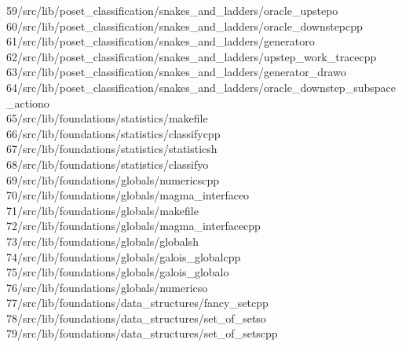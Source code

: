 \begin{tabbing}
59\>/src/lib/poset\_classification/snakes\_and\_ladders/oracle\_upstepo\\[0pt]
60\>/src/lib/poset\_classification/snakes\_and\_ladders/oracle\_downstepcpp\\[0pt]
61\>/src/lib/poset\_classification/snakes\_and\_ladders/generatoro\\[0pt]
62\>/src/lib/poset\_classification/snakes\_and\_ladders/upstep\_work\_tracecpp\\[0pt]
63\>/src/lib/poset\_classification/snakes\_and\_ladders/generator\_drawo\\[0pt]
64\>/src/lib/poset\_classification/snakes\_and\_ladders/oracle\_downstep\_subspace\_actiono\\[0pt]
65\>/src/lib/foundations/statistics/makefile\\[0pt]
66\>/src/lib/foundations/statistics/classifycpp\\[0pt]
67\>/src/lib/foundations/statistics/statisticsh\\[0pt]
68\>/src/lib/foundations/statistics/classifyo\\[0pt]
69\>/src/lib/foundations/globals/numericscpp\\[0pt]
70\>/src/lib/foundations/globals/magma\_interfaceo\\[0pt]
71\>/src/lib/foundations/globals/makefile\\[0pt]
72\>/src/lib/foundations/globals/magma\_interfacecpp\\[0pt]
73\>/src/lib/foundations/globals/globalsh\\[0pt]
74\>/src/lib/foundations/globals/galois\_globalcpp\\[0pt]
75\>/src/lib/foundations/globals/galois\_globalo\\[0pt]
76\>/src/lib/foundations/globals/numericso\\[0pt]
77\>/src/lib/foundations/data\_structures/fancy\_setcpp\\[0pt]
78\>/src/lib/foundations/data\_structures/set\_of\_setso\\[0pt]
79\>/src/lib/foundations/data\_structures/set\_of\_setscpp\\[0pt]

\end{tabbing}
